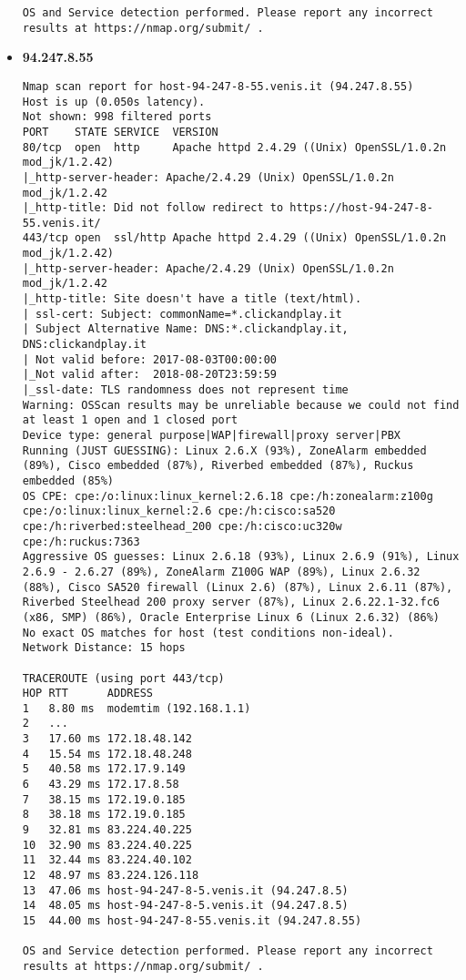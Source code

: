 \begin{itemize}
\begin{verbatim}
OS and Service detection performed. Please report any incorrect results at https://nmap.org/submit/ .
        \end{verbatim}

      \item \textbf{94.247.8.55}
        \begin{verbatim}
Nmap scan report for host-94-247-8-55.venis.it (94.247.8.55)
Host is up (0.050s latency).
Not shown: 998 filtered ports
PORT    STATE SERVICE  VERSION
80/tcp  open  http     Apache httpd 2.4.29 ((Unix) OpenSSL/1.0.2n mod_jk/1.2.42)
|_http-server-header: Apache/2.4.29 (Unix) OpenSSL/1.0.2n mod_jk/1.2.42
|_http-title: Did not follow redirect to https://host-94-247-8-55.venis.it/
443/tcp open  ssl/http Apache httpd 2.4.29 ((Unix) OpenSSL/1.0.2n mod_jk/1.2.42)
|_http-server-header: Apache/2.4.29 (Unix) OpenSSL/1.0.2n mod_jk/1.2.42
|_http-title: Site doesn't have a title (text/html).
| ssl-cert: Subject: commonName=*.clickandplay.it
| Subject Alternative Name: DNS:*.clickandplay.it, DNS:clickandplay.it
| Not valid before: 2017-08-03T00:00:00
|_Not valid after:  2018-08-20T23:59:59
|_ssl-date: TLS randomness does not represent time
Warning: OSScan results may be unreliable because we could not find at least 1 open and 1 closed port
Device type: general purpose|WAP|firewall|proxy server|PBX
Running (JUST GUESSING): Linux 2.6.X (93%), ZoneAlarm embedded (89%), Cisco embedded (87%), Riverbed embedded (87%), Ruckus embedded (85%)
OS CPE: cpe:/o:linux:linux_kernel:2.6.18 cpe:/h:zonealarm:z100g cpe:/o:linux:linux_kernel:2.6 cpe:/h:cisco:sa520 cpe:/h:riverbed:steelhead_200 cpe:/h:cisco:uc320w cpe:/h:ruckus:7363
Aggressive OS guesses: Linux 2.6.18 (93%), Linux 2.6.9 (91%), Linux 2.6.9 - 2.6.27 (89%), ZoneAlarm Z100G WAP (89%), Linux 2.6.32 (88%), Cisco SA520 firewall (Linux 2.6) (87%), Linux 2.6.11 (87%), Riverbed Steelhead 200 proxy server (87%), Linux 2.6.22.1-32.fc6 (x86, SMP) (86%), Oracle Enterprise Linux 6 (Linux 2.6.32) (86%)
No exact OS matches for host (test conditions non-ideal).
Network Distance: 15 hops

TRACEROUTE (using port 443/tcp)
HOP RTT      ADDRESS
1   8.80 ms  modemtim (192.168.1.1)
2   ...
3   17.60 ms 172.18.48.142
4   15.54 ms 172.18.48.248
5   40.58 ms 172.17.9.149
6   43.29 ms 172.17.8.58
7   38.15 ms 172.19.0.185
8   38.18 ms 172.19.0.185
9   32.81 ms 83.224.40.225
10  32.90 ms 83.224.40.225
11  32.44 ms 83.224.40.102
12  48.97 ms 83.224.126.118
13  47.06 ms host-94-247-8-5.venis.it (94.247.8.5)
14  48.05 ms host-94-247-8-5.venis.it (94.247.8.5)
15  44.00 ms host-94-247-8-55.venis.it (94.247.8.55)

OS and Service detection performed. Please report any incorrect results at https://nmap.org/submit/ .
      \end{verbatim}

    \end{itemize}

